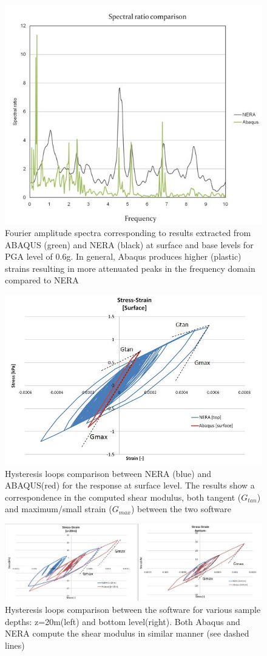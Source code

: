 	\begin{figure}[h!]
		\centering
		\includegraphics[width=0.6\linewidth]{"spectral2"}
		\caption{Fourier amplitude spectra corresponding to results extracted from ABAQUS (green) and NERA (black) at surface and base levels for PGA level of 0.6g. In general, Abaqus produces higher (plastic) strains resulting in more attenuated peaks in the frequency domain compared to NERA}
		\label{fourier2}
	\end{figure}
	
	\begin{figure}[h!]
		\centering
		\includegraphics[width=0.6\linewidth]{"tau_gamma1"}
		\caption{Hysteresis loops comparison between NERA (blue) and ABAQUS(red) for the response at surface level. The results show a correspondence in the computed shear modulus, both tangent ($G_{tan}$) and maximum/small strain ($G_{max}$) between the two software}
		\label{tau_gamma1}
	\end{figure}
	
	\begin{figure}[h!]
		\centering
		\includegraphics[width=0.85\linewidth]{"tau_gamma2"}
		\caption{Hysteresis loops comparison between the software for various sample depths: z=20m(left) and bottom level(right). Both Abaqus and NERA compute the shear modulus in similar manner (see dashed lines)}
		\label{tau_gamma2}
	\end{figure}
	
